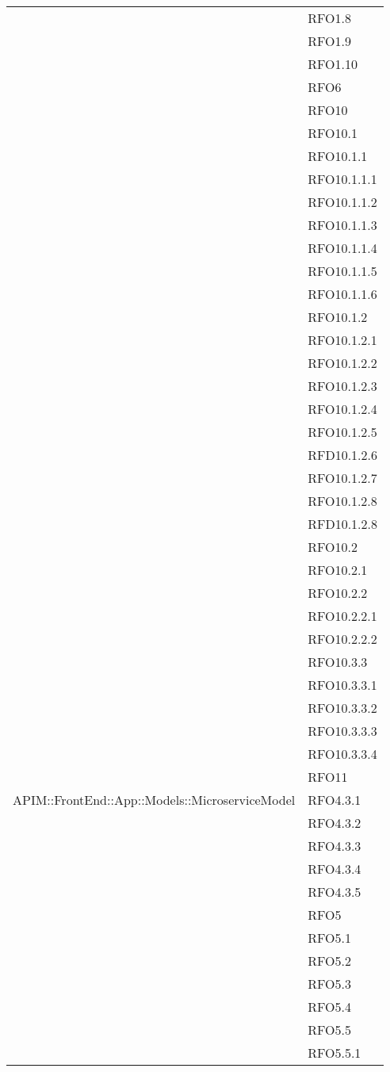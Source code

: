 \begin{longtable}{ p{12cm} | p{4cm} }
	& RFO1.8 \\
	& RFO1.9 \\
	& RFO1.10 \\
	& RFO6 \\
	& RFO10 \\
	& RFO10.1 \\
	& RFO10.1.1 \\
	& RFO10.1.1.1 \\
	& RFO10.1.1.2 \\
	& RFO10.1.1.3 \\
	& RFO10.1.1.4 \\
	& RFO10.1.1.5 \\
	& RFO10.1.1.6 \\
	& RFO10.1.2 \\
	& RFO10.1.2.1 \\
	& RFO10.1.2.2 \\
	& RFO10.1.2.3 \\
	& RFO10.1.2.4 \\
	& RFO10.1.2.5 \\
	& RFD10.1.2.6 \\
	& RFO10.1.2.7 \\
	& RFO10.1.2.8 \\
	& RFD10.1.2.8 \\
	& RFO10.2 \\
	& RFO10.2.1 \\
	& RFO10.2.2 \\
	& RFO10.2.2.1 \\
	& RFO10.2.2.2 \\
	& RFO10.3.3 \\
	& RFO10.3.3.1 \\
	& RFO10.3.3.2 \\
	& RFO10.3.3.3 \\
	& RFO10.3.3.4 \\
	& RFO11 \\
	\hline
	APIM::FrontEnd::App::Models::MicroserviceModel
	& RFO4.3.1 \\
	& RFO4.3.2 \\
	& RFO4.3.3 \\
	& RFO4.3.4 \\
	& RFO4.3.5 \\
	& RFO5 \\
	& RFO5.1 \\
	& RFO5.2 \\
	& RFO5.3 \\
	& RFO5.4 \\
	& RFO5.5 \\
	& RFO5.5.1 \\

\end{longtable}
